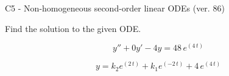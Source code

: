 \begin{exercise}
  \begin{exerciseTitle}C5 - Non-homogeneous second-order linear ODEs (ver. 86)\end{exerciseTitle}
  \begin{exerciseStatement}
    
Find the solution to the given ODE.

    
\[y''+0y'-4y = 48 \, e^{\left(4 \, t\right)}\]

  \end{exerciseStatement}
  \begin{exerciseAnswer}
    
\[y= k_{2} e^{\left(2 \, t\right)} + k_{1} e^{\left(-2 \, t\right)} + 4 \, e^{\left(4 \, t\right)}\]

  \end{exerciseAnswer}
\end{exercise}